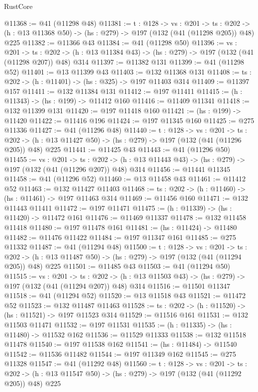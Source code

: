 \begin{lexlean}{RustCore}
\begin{coremodule}
@11368 := @41 (@11298 @48)
@11381 := {t : @128} ->
  {vs : @201} ->
  {ts : @202} -> (h : @13 @11368 @50) -> (hs : @279) -> @197 (@132 (@41 (@11298 @205)) @48) @225
@11382 := @11366 @43
@11384 := @41 (@11298 @50)
@11396 := {vs : @201} ->
  {ts : @202} -> (h : @13 @11384 @43) -> (hs : @279) -> @197 (@132 (@41 (@11298 @207)) @48) @314
@11397 := @11382 @131
@11399 := @41 (@11298 @52)
@11401 := @13 @11399 @43
@11403 := @132 @11368 @131
@11408 := {ts : @202} -> (h : @11401) -> (hs : @325) -> @197 @11403 @314
@11409 := @11397 @157
@11411 := @132 @11384 @131
@11412 := @197 @11411
@11415 := (h : @11343) -> (hs : @199) -> @11412 @160
@11416 := @11409 @11341
@11418 := @132 @11399 @131
@11420 := @197 @11418 @160
@11421 := (hs : @199) -> @11420
@11422 := @11416 @196
@11424 := @197 @11345 @160
@11425 := @275 @11336
@11427 := @41 (@11296 @48)
@11440 := {t : @128} ->
  {vs : @201} ->
  {ts : @202} -> (h : @13 @11427 @50) -> (hs : @279) -> @197 (@132 (@41 (@11296 @205)) @48) @225
@11441 := @11425 @43
@11443 := @41 (@11296 @50)
@11455 := {vs : @201} ->
  {ts : @202} -> (h : @13 @11443 @43) -> (hs : @279) -> @197 (@132 (@41 (@11296 @207)) @48) @314
@11456 := @11441 @11345
@11458 := @41 (@11296 @52)
@11460 := @13 @11458 @43
@11461 := @11412 @52
@11463 := @132 @11427 @11403
@11468 := {ts : @202} -> (h : @11460) -> (hs : @11461) -> @197 @11463 @314
@11469 := @11456 @160
@11471 := @132 @11443 @11411
@11472 := @197 @11471
@11475 := (h : @11339) -> (hs : @11420) -> @11472 @161
@11476 := @11469 @11337
@11478 := @132 @11458 @11418
@11480 := @197 @11478 @161
@11481 := (hs : @11424) -> @11480
@11482 := @11476 @11422
@11484 := @197 @11347 @161
@11485 := @275 @11332
@11487 := @41 (@11294 @48)
@11500 := {t : @128} ->
  {vs : @201} ->
  {ts : @202} -> (h : @13 @11487 @50) -> (hs : @279) -> @197 (@132 (@41 (@11294 @205)) @48) @225
@11501 := @11485 @43
@11503 := @41 (@11294 @50)
@11515 := {vs : @201} ->
  {ts : @202} -> (h : @13 @11503 @43) -> (hs : @279) -> @197 (@132 (@41 (@11294 @207)) @48) @314
@11516 := @11501 @11347
@11518 := @41 (@11294 @52)
@11520 := @13 @11518 @43
@11521 := @11472 @52
@11523 := @132 @11487 @11463
@11528 := {ts : @202} -> (h : @11520) -> (hs : @11521) -> @197 @11523 @314
@11529 := @11516 @161
@11531 := @132 @11503 @11471
@11532 := @197 @11531
@11535 := (h : @11335) -> (hs : @11480) -> @11532 @162
@11536 := @11529 @11333
@11538 := @132 @11518 @11478
@11540 := @197 @11538 @162
@11541 := (hs : @11484) -> @11540
@11542 := @11536 @11482
@11544 := @197 @11349 @162
@11545 := @275 @11328
@11547 := @41 (@11292 @48)
@11560 := {t : @128} ->
  {vs : @201} ->
  {ts : @202} -> (h : @13 @11547 @50) -> (hs : @279) -> @197 (@132 (@41 (@11292 @205)) @48) @225

\end{coremodule}
\end{lexlean}
